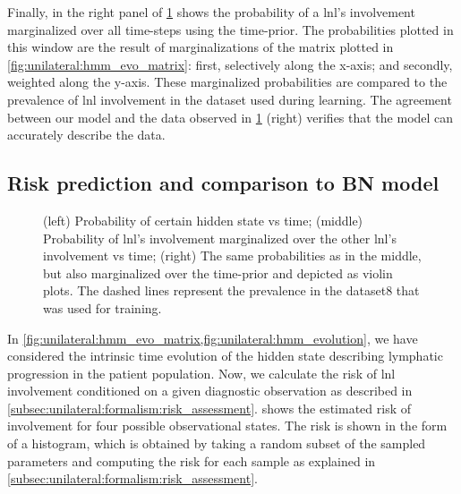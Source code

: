 \documentclass[\relativeRoot/main.tex]{subfiles}
\begin{document}
Finally, in the right panel of \cref{fig:unilateral:hmm_evolution} shows the probability of a \gls{lnl}'s involvement marginalized over all time-steps using the time-prior. The probabilities plotted in this window are the result of marginalizations of the matrix plotted in \cref{fig:unilateral:hmm_evo_matrix}: first, selectively along the x-axis; and secondly, weighted along the y-axis. These marginalized probabilities are compared to the prevalence of \gls{lnl} involvement in the dataset used during learning. The agreement between our model and the data observed in \cref{fig:unilateral:hmm_evolution} (right) verifies that the model can accurately describe the data.

\subsection{Risk prediction and comparison to BN model}
\label{subsec:unilateral:application:risk_predict}

\begin{figure}
    \centering
    \def\svgwidth{1.01\textwidth}
    
    \caption{(left) Probability of certain hidden state vs time; (middle) Probability of \gls{lnl}'s involvement marginalized over the other \gls{lnl}'s involvement vs time; (right) The same probabilities as in the middle, but also marginalized over the time-prior and depicted as violin plots. The dashed lines represent the prevalence in the dataset8 that was used for training.}
    \label{fig:unilateral:hmm_evolution}
\end{figure}

In \cref{fig:unilateral:hmm_evo_matrix,fig:unilateral:hmm_evolution}, we have considered the intrinsic time evolution of the hidden state describing lymphatic progression in the patient population. Now, we calculate the risk of \gls{lnl} involvement conditioned on a given diagnostic observation as described in \cref{subsec:unilateral:formalism:risk_assessment}.  shows the estimated risk of involvement for four possible observational states. The risk is shown in the form of a histogram, which is obtained by taking a random subset of the sampled parameters and computing the risk for each sample as explained in \cref{subsec:unilateral:formalism:risk_assessment}.
\end{document}
